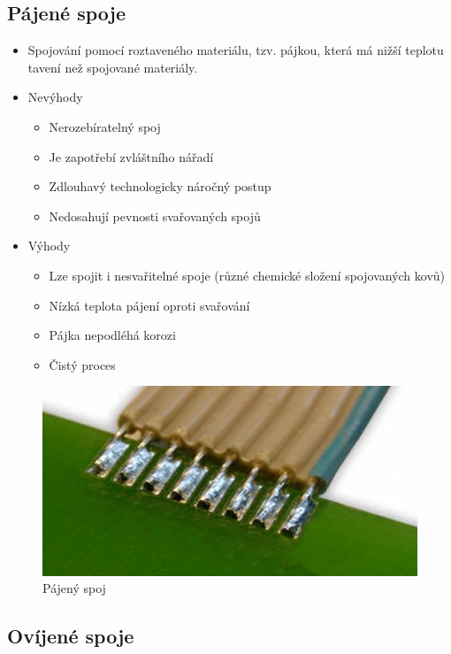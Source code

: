 \documentclass{article}
\begin{document}
\subsection{Pájené spoje}
\begin{itemize}
  \item Spojování pomocí roztaveného materiálu, tzv. pájkou, která má nižší teplotu tavení než spojované materiály.
  \item Nevýhody
  \begin{itemize}
    \item Nerozebíratelný spoj
    \item Je zapotřebí zvláštního nářadí
    \item Zdlouhavý technologicky náročný postup
    \item Nedosahují pevnosti svařovaných spojů
  \end{itemize}
  \item Výhody
  \begin{itemize}
    \item Lze spojit i nesvařitelné spoje (různé chemické složení spojovaných kovů)
    \item Nízká teplota pájení oproti svařování
    \item Pájka nepodléhá korozi
    \item Čistý proces
  \end{itemize}  
\end{itemize}

\begin{figure}[H]
  \begin{minipage}[t]{\textwidth}
    \centering
    \includegraphics[width=\textwidth]{pajeni1.jpg}
    \caption{Pájený spoj}
  \end{minipage}
\end{figure}

\newpage
\subsection{Ovíjené spoje}
\end{document}
